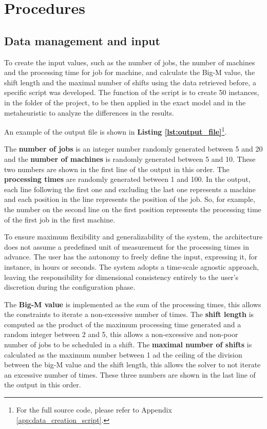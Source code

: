 \chapter{Procedures}
\label{sec:intro_proc}

\section[Data management and input]{Data management and input}

To create the input values, such as the number of jobs, the number of machines and the processing time for job for machine, and calculate the Big-M value, the shift length and the maximal number of shifts using the data retrieved before, a specific script was developed. The function of the script is to create 50 instances, in the folder of the project, to be then applied in the exact model and in the metaheuristic to analyze the differences in the results.

An example of the output file is shown in \textbf{Listing \ref{lst:output_file}}\footnote{For the full source code, please refer to Appendix \ref{app:data_creation_script}.}.



The \textbf{number of jobs} is an integer number randomly generated between 5 and 20 and the \textbf{number of machines} is randomly generated between 5 and 10. These two numbers are shown in the first line of the output in this order.  The \textbf{processing times} are randomly generated between 1 and 100. In the output, each line following the first one and excluding the last one represents a machine and each position in the line represents the position of the job. So, for example, the number on the second line on the first position represents the processing time of the first job in the first machine. 

To ensure maximum flexibility and generalizability of the system, the architecture does not assume a predefined unit of measurement for the processing times in advance. The user has the autonomy to freely define the input, expressing it, for instance, in hours or seconds. The system adopts a time-scale agnostic approach, leaving the responsibility for dimensional consistency entirely to the user's discretion during the configuration phase. 

The \textbf{Big-M value} is implemented as the sum of the processing times, this allows the constraints to iterate a non-excessive number of times. The \textbf{shift length} is computed as the product of the maximum processing time generated and a random integer between 2 and 5, this allows a non-excessive and non-poor number of jobs to be scheduled in a shift. The \textbf{maximal number of shifts} is calculated as the maximum number between 1 ad the ceiling of the division between the big-M value and the shift length, this allows the solver to not iterate an excessive number of times. These three numbers are shown in the last line of the output in this order.

